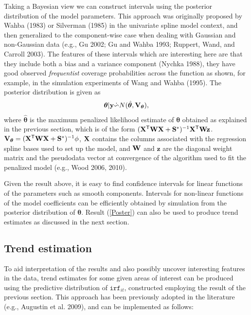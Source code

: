 \documentclass[10pt] {article}
\newcommand{\beq}{\begin{equation}}
\newcommand{\eeq}{\end{equation}}
\newcommand{\ts}{^{\sf T}}
\newcommand{\X}{{\bf X}}
\theoremstyle{definition}
\theoremstyle{plain}
\begin{document}
Taking a Bayesian view we can construct intervals using the posterior distribution of the model parameters. This approach was originally proposed by Wahba (1983) or Silverman (1985) in the univariate spline model context, and then generalized to the component-wise case when dealing with Gaussian and non-Gaussian data (e.g., Gu 2002; Gu and Wahba 1993; Ruppert, Wand, and Carroll 2003). The features of these intervals which are interesting here are that they include both a bias and a variance component (Nychka 1988), they have good observed \textit{frequentist} coverage probabilities across the function as shown, for example, in the simulation experiments of Wang and Wahba (1995). The posterior distribution is given as
\beq
\bm\theta|{\bf y} \dot{\backsim} N( \hat{\bm\theta}, {\bf V}_{\bm\theta} ),
\label{Poster}
\eeq
where $\hat{\bm\theta}$ is the maximum penalized likelihood estimate of $\bm\theta$ obtained as explained in the previous section, which is of the form $(\X\ts{\bf W}\X+{\bf S}^*)^{-1}\X\ts{\bf W}{\bf z}$. ${\bf V}_{\bm\theta} = (\X\ts{\bf W}\X+{\bf S}^*)^{-1}\phi$, $\X$ contains the columns associated with the regression spline bases used to set up the model, and ${\bf W}$ and $\mathbf{z}$ are the diagonal weight matrix and the pseudodata vector at convergence of the algorithm used to fit the penalized model (e.g., Wood 2006, 2010).

Given the result above, it is easy to find confidence intervals for linear functions of the parameters such as smooth components. Intervals for non-linear functions of the model coefficients can be efficiently obtained by simulation from the posterior distribution of $\bm\theta$. Result (\ref{Poster}) can also be used to produce trend estimates as discussed in the next section.

\subsection{Trend estimation \label{TE}}
To aid interpretation of the results and also possibly uncover interesting features in the data, trend estimates for some given areas of interest can be produced using the predictive distribution of $\texttt{irf}_{it}$, constructed employing the result of the previous section. This approach has been previously adopted in the literature (e.g., Augustin et al. 2009), and can be implemented as follows:
\end{document}
